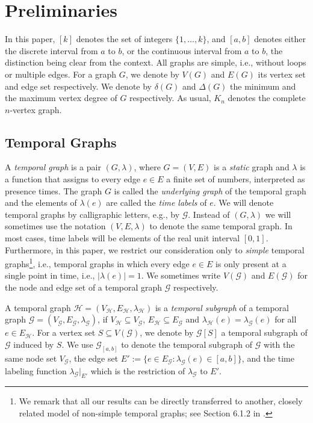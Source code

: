 \documentclass[a4paper,11pt]{article}
\theoremstyle{definition}
\theoremstyle{plain}
\newcommand{\GGG}{\mathcal{G}}
\newcommand{\HHH}{\mathcal{H}}
\newcommand{\G}{\mathcal G}
\begin{document}
\section{Preliminaries}
\label{sec:Preliminaries}

In this paper, $[k]$ denotes the set of integers $\{1, \ldots, k\}$, and $[a, b]$ denotes either the discrete interval from $a$ to $b$, or the continuous interval from $a$ to $b$, the distinction being clear from the context.
All graphs are simple, i.e., without loops or multiple edges.
For a graph $G$, we denote by $V(G)$ and $E(G)$ its vertex set and edge set respectively.
We denote by $\delta(G)$ and $\Delta(G)$ the minimum and the maximum vertex degree of $G$ respectively.
As usual, $K_n$ denotes the complete $n$-vertex graph.

\subsection{Temporal Graphs}
A \emph{temporal graph} is a pair $(G, \lambda)$, where $G=(V,E)$ is a \emph{static} graph and $\lambda$ is a function
that assigns to every edge $e \in E$ a finite set of numbers, interpreted as presence times. The graph $G$
is called the \emph{underlying graph} of the temporal graph and the elements of $\lambda(e)$ are called the \emph{time labels} of $e$.
We will denote temporal graphs by calligraphic letters, e.g., by $\GGG$. Instead of $(G, \lambda)$ we will sometimes use the notation
$(V,E, \lambda)$ to denote the same temporal graph. In most cases, time labels will be elements of the real unit interval $[0,1]$.
Furthermore, in this paper, we restrict our consideration only to \emph{simple} temporal graphs\footnote{We remark that all our results can be directly transferred to another, closely related model of non-simple temporal graphs; see Section 6.1.2 in \cite{CasteigtsRRZ21}.},
i.e., temporal graphs in which every edge $e \in E$ is only present at a single point in time, i.e., $|\lambda(e)| = 1$.
%
We sometimes write $V(\GGG)$ and $E(\GGG)$ for the node and edge set of a temporal graph $\GGG$ respectively.

A temporal graph $\HHH=(V_\HHH, E_\HHH, \lambda_\HHH)$ is a \emph{temporal subgraph} of a temporal graph $\GGG=(V_\GGG, E_\GGG, \lambda_\GGG)$, if $V_\HHH\subseteq V_\GGG$, $E_\HHH\subseteq E_\GGG$ and $\lambda_\HHH(e)=\lambda_\GGG(e)$ for all $e\in E_\HHH$.
For a vertex set $S \subseteq V(\G)$, we denote by $\G[S]$ a temporal subgraph of $\G$
induced by $S$.
We use $\GGG_{[a,b]}$ to denote the temporal subgraph of $\GGG$ with the same node set $V_\GGG$, the edge set $E':=\{e\in E_\GGG:\lambda_\GGG(e)\in [a,b]\}$, and the time labeling function $\lambda_\GGG|_{E'}$ which is the restriction of $\lambda_\GGG$ to $E'$.
\end{document}
